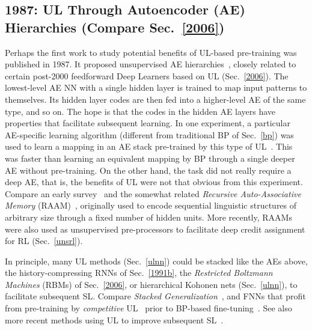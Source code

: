 \documentclass[letterpaper]{article}
\begin{document}
\begin{sloppypar}
\subsection{1987: UL Through Autoencoder (AE) Hierarchies (Compare Sec.~\ref{2006})}
\label{1987}

Perhaps the first work to study
 potential benefits of UL-based pre-training was published in 1987.
It proposed unsupervised AE hierarchies~\citep{ballard1987modular}, 
closely related to certain 
post-2000 feedforward Deep Learners based on UL (Sec.~\ref{2006}).
The lowest-level AE NN with a single hidden layer is trained to map input patterns to themselves. Its hidden layer codes are then fed into a higher-level AE of the same type, and so on. The hope is that the codes in the hidden AE layers have properties that facilitate subsequent learning. 
In one experiment, a particular AE-specific learning algorithm (different from traditional  BP of Sec.~\ref{bp}) was used to
learn a mapping in an AE stack pre-trained by this type of UL~\citep{ballard1987modular}. This was faster than 
learning an equivalent mapping by BP through a single deeper AE without pre-training. 
On the other hand, the task did not really require a deep AE, that is, the benefits of UL were not that obvious from this experiment.
Compare an early survey~\citep{hinton1989connectionist} and the somewhat 
related {\em Recursive Auto-Associative Memory} (RAAM)~\citep{pollack1988implications,Pollack:90,Melnik2000},
originally used to encode sequential linguistic structures of arbitrary size 
through a fixed number of hidden units.
More recently, RAAMs were also used as unsupervised pre-processors
to facilitate deep credit assignment for RL \citep{Gisslen2011agi} (Sec.~\ref{unsrl}).

In principle, many UL methods (Sec.~\ref{ulnn}) could be stacked like the  
AEs above,
the  history-compressing RNNs of Sec.~\ref{1991b},
the {\em Restricted Boltzmann Machines} (RBMs) of Sec.~\ref{2006},
or hierarchical Kohonen nets (Sec.~\ref{ulnn}),
to facilitate subsequent SL.
Compare {\em Stacked Generalization}~\citep{wolpert:92stacked,ting1997},
and FNNs that profit from pre-training by {\em competitive} UL~\citep[e.g.,][]{RumelhartZipser:86}
prior to BP-based fine-tuning~\citep{maclin1995}.
See also more recent methods using UL to improve subsequent SL~\citep[e.g.,][]{Behnke:IJCNN1999,Behnke:IJCNN2003,wiskott2013}.



\end{sloppypar}
\end{document}
